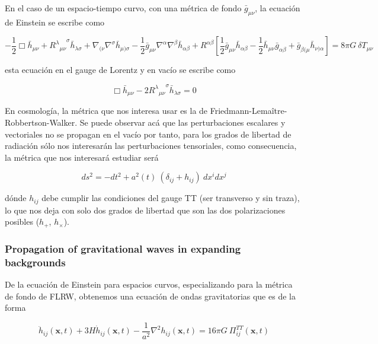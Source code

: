En el caso de un espacio-tiempo curvo, con una métrica de fondo $\bar{g}_{\mu \nu}$, la ecuación de Einstein se escribe como

\begin{equation}
    - \frac{1}{2} \Box \bar{h}_{\mu \nu} + {{R^{\lambda}}_{\mu\nu}}^\sigma \bar{h}_{\lambda \sigma} + \nabla_{(\nu} \nabla^\sigma \bar{h}_{\mu)\sigma} - \frac{1}{2} \bar{g}_{\mu\nu} \nabla^\alpha \nabla^\beta \bar{h}_{\alpha \beta} + R^{\alpha \beta} \left[ \frac{1}{2} \bar{g}_{\mu \nu} \bar{h}_{\alpha \beta} - \frac{1}{2} \bar{h}_{\mu \nu} \bar{g}_{\alpha \beta} + \bar{g}_{\beta (\mu} \bar{h}_{\nu) \alpha} \right] = 8 \pi G \ \delta T_{\mu\nu}
\end{equation}

\noindent
esta ecuación en el gauge de Lorentz y en vacío se escribe como

\begin{equation}
    \Box \bar{h}_{\mu\nu} - 2 {{R^{\lambda}}_{\mu\nu}}^\sigma \bar{h}_{\lambda \sigma} = 0
\end{equation}

En cosmología, la métrica que nos interesa usar es la de Friedmann-Lemaître-Robbertson-Walker. Se puede observar acá que las perturbaciones escalares y vectoriales no se propagan en el vacío por tanto, para los grados de libertad de radiación sólo nos interesarán las perturbaciones tensoriales, como consecuencia, la métrica que nos interesará estudiar será

\begin{equation}
    ds^2 = - dt^2 + a^2 (t) \ \left(\delta_{ij} + h_{ij} \right) \ dx^i dx^j
\end{equation}

\noindent
dónde $h_{ij}$ debe cumplir las condiciones del gauge TT (ser transverso y sin traza), lo que nos deja con solo dos grados de libertad que son las dos polarizaciones posibles ($h_+$, $h_\times$).

\subsubsection{Propagation of gravitational waves in expanding backgrounds}

De la ecuación de Einstein para espacios curvos, especializando para la métrica de fondo de FLRW, obtenemos una ecuación de ondas gravitatorias que es de la forma

\begin{equation}
    \ddot{h}_{ij} \left( \textbf{x}, t \right) + 3 H \dot{h}_{ij} \left( \textbf{x}, t \right) - \frac{1}{a^2} \nabla^2 h_{ij} \left( \textbf{x}, t \right) = 16 \pi G \ \Pi_{ij}^{TT} \left( \textbf{x}, t \right)
\end{equation}


